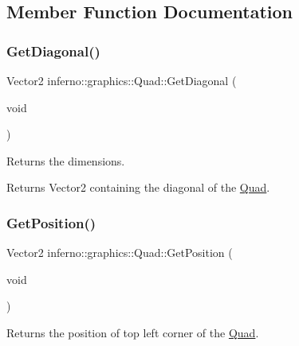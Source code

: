 \subsection{Member Function Documentation}
\mbox{\label{classinferno_1_1graphics_1_1_quad_ad7b1b10ee7f32e9486b41ae89cf0d71b}} 
\subsubsection{\texorpdfstring{Get\+Diagonal()}{GetDiagonal()}}
{\footnotesize\ttfamily Vector2 inferno\+::graphics\+::\+Quad\+::\+Get\+Diagonal (\begin{DoxyParamCaption}\item[{void}]{ }\end{DoxyParamCaption})\hspace{0.3cm}{\ttfamily [inline]}}



Returns the dimensions. 

\begin{DoxyReturn}{Returns}
Vector2 containing the diagonal of the \mbox{\hyperlink{classinferno_1_1graphics_1_1_quad}{Quad}}. 
\end{DoxyReturn}
\mbox{\label{classinferno_1_1graphics_1_1_quad_a8e6e9aad8b00849c87acd35a614cea84}} 
\subsubsection{\texorpdfstring{Get\+Position()}{GetPosition()}}
{\footnotesize\ttfamily Vector2 inferno\+::graphics\+::\+Quad\+::\+Get\+Position (\begin{DoxyParamCaption}\item[{void}]{ }\end{DoxyParamCaption})\hspace{0.3cm}{\ttfamily [inline]}}



Returns the position of top left corner of the \mbox{\hyperlink{classinferno_1_1graphics_1_1_quad}{Quad}}. 

